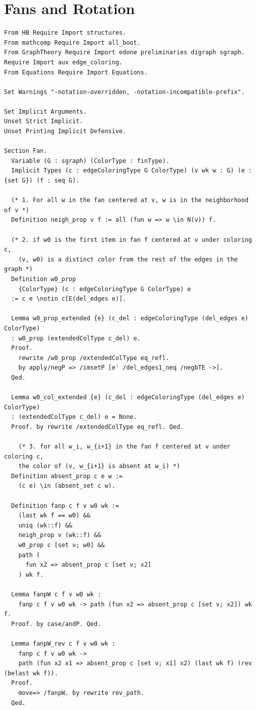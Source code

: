 \section{Fans and Rotation}\label{apdx:fan}
\begin{verbatim}
From HB Require Import structures.
From mathcomp Require Import all_boot.
From GraphTheory Require Import edone preliminaries digraph sgraph.
Require Import aux edge_coloring.
From Equations Require Import Equations.

Set Warnings "-notation-overridden, -notation-incompatible-prefix".

Set Implicit Arguments.
Unset Strict Implicit.
Unset Printing Implicit Defensive.

Section Fan.
  Variable (G : sgraph) (ColorType : finType).
  Implicit Types (c : edgeColoringType G ColorType) (v wk w : G) (e : {set G}) (f : seq G).

  (* 1. For all w in the fan centered at v, w is in the neighborhood of v *)
  Definition neigh_prop v f := all (fun w => w \in N(v)) f.

  (* 2. if w0 is the first item in fan f centered at v under coloring c,
    (v, w0) is a distinct color from the rest of the edges in the graph *)
  Definition w0_prop 
    {ColorType} (c : edgeColoringType G ColorType) e 
  := c e \notin c[E(del_edges e)].

  Lemma w0_prop_extended {e} (c_del : edgeColoringType (del_edges e) ColorType)
  : w0_prop (extendedColType c_del) e.
  Proof. 
    rewrite /w0_prop /extendedColType eq_refl.
    by apply/negP => /imsetP [e' /del_edges1_neq /negbTE ->].
  Qed.

  Lemma w0_col_extended {e} (c_del : edgeColoringType (del_edges e) ColorType)
  : (extendedColType c_del) e = None.
  Proof. by rewrite /extendedColType eq_refl. Qed.

    (* 3. for all w_i, w_{i+1} in the fan f centered at v under coloring c,
    the color of (v, w_{i+1} is absent at w_i) *)
  Definition absent_prop c e w := 
    (c e) \in (absent_set c w).

  Definition fanp c f v w0 wk := 
    (last wk f == w0) && 
    uniq (wk::f) &&
    neigh_prop v (wk::f) &&
    w0_prop c [set v; w0] &&
    path (
      fun x2 => absent_prop c [set v; x2]
    ) wk f.

  Lemma fanpW c f v w0 wk : 
    fanp c f v w0 wk -> path (fun x2 => absent_prop c [set v; x2]) wk f.
  Proof. by case/andP. Qed.

  Lemma fanpW_rev c f v w0 wk : 
    fanp c f v w0 wk -> 
    path (fun x2 x1 => absent_prop c [set v; x1] x2) (last wk f) (rev (belast wk f)).
  Proof.
    move=> /fanpW. by rewrite rev_path.
  Qed.


\end{verbatim}
